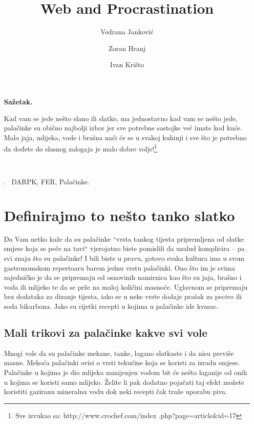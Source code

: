 \documentclass[11pt,twocolumn,english]{article}
\let\LaTeXtitle\title
\renewcommand{\title}[1]{\LaTeXtitle{\Large \textbf{#1}}}
\renewenvironment{abstract}
{\noindent \large \bf Sažetak.\normalsize\begin{it}}
{\end{it}\\}
\newenvironment{keywords}
{\noindent {\large {\bf Ključne riječi}}.~}{}
\begin{document}
\title{Web and Procrastination}
\author{Vedrana Janković}
\author{Zoran Hranj}
\author{Ivan Krišto}

\date{}

\maketitle
\thispagestyle{empty}
\pagestyle{empty}

\begin{abstract}
Kad vam se jede nešto slano ili slatko, ma jednostavno kad vam se nešto jede,
palačinke su obično najbolji izbor jer sve potrebne sastojke već imate kod kuće.
Malo jaja, mlijeka, vode i brašna naći će se u svakoj kuhinji i sve što je
potrebno da dođete do slasnog zalogaja je malo dobre volje!\footnote{Sve izvukao sa: http://www.crochef.com/index .php?page=article\&id=17}
\end{abstract}

\begin{keywords}
DARPK, FER, Palačinke.
\end{keywords}

\section{Definirajmo to nešto tanko slatko}
Da Vam netko kaže da su palačinke  “vrsta tankog tijesta pripremljena od slatke
smjese koja se peče na tavi“ vjerojatno biste pomislili da uzalud komplicira – pa
svi znaju što su palačinke! I bili biste u pravu, gotovo svaka kultura ima u svom
gastronomskom repertoaru barem jednu vrstu palačinki. Ono što im je svima
zajedničko je da se pripremaju od osnovinih namirnica kao što su jaja, brašno i
voda ili mlijeko te da se prže na maloj količini masnoće. Uglavnom se pripremaju
bez dodataka za dizanje tijesta, iako se u neke vrste dodaje prašak za pecivo ili
soda bikarbona. Jako su rijetki recepti u kojima u palačinke ide kvasac.

\subsection{Mali trikovi za palačinke kakve svi vole}
Mnogi vole da su palačinke mekane, tanke, lagano slatkaste i da nisu previše
masne. Mekoća palačinki ovisi o vrsti tekućine koja se koristi za izradu smjese.
Palačinke u kojima je dio mlijeka zamijenjen vodom bit će nešto laganije od onih
u kojima se koristi samo mlijeko. Želite li pak dodatno pojačati taj efekt možete
koristiti gaziranu mineralnu vodu dok neki recepti čak traže uporabu piva.
\end{document}
